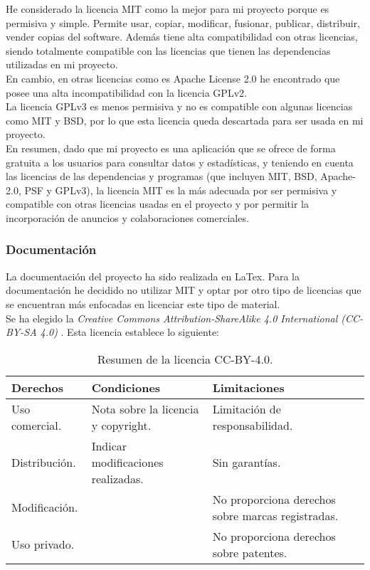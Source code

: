 He considerado la licencia MIT como la mejor para mi proyecto porque es permisiva y simple. Permite usar, copiar, modificar, fusionar, publicar, distribuir, vender copias del software. Además tiene alta compatibilidad con otras licencias, siendo totalmente compatible con las licencias que tienen las dependencias utilizadas en mi proyecto. \\
En cambio, en otras licencias como es Apache License 2.0 he encontrado que posee una alta incompatibilidad con la licencia GPLv2. \\
La licencia GPLv3 es menos permisiva y no es compatible con algunas licencias como MIT y BSD, por lo que esta licencia queda descartada para ser usada en mi proyecto. \\

En resumen, dado que mi proyecto es una aplicación que se ofrece de forma gratuita a los usuarios para consultar datos y estadísticas, y teniendo en cuenta las licencias de las dependencias y programas (que incluyen MIT, BSD, Apache-2.0, PSF y GPLv3), la licencia MIT es la más adecuada por ser permisiva y compatible con otras licencias usadas en el proyecto y por permitir la incorporación de anuncios y colaboraciones comerciales.

\subsubsection{Documentación}
La documentación del proyecto ha sido realizada en LaTex. Para la documentación he decidido no utilizar MIT y optar por otro tipo de licencias que se encuentran más enfocadas en licenciar este tipo de material. \\
Se ha elegido la \textit{Creative Commons Attribution-ShareAlike 4.0 International (CC-BY-SA 4.0)} \cite{CC:latex}. Esta licencia establece lo siguiente: \\
\raggedbottom 
\begin{table}[H] %
\centering
\begin{tabular}{>{\raggedright}m{4cm} >{\raggedright}m{4cm} >{\raggedright\arraybackslash}m{4cm}}
\toprule
\textbf{Derechos} & \textbf{Condiciones} & \textbf{Limitaciones} \\
\midrule
Uso comercial. & Nota sobre la licencia y copyright. & Limitación de responsabilidad. \\
Distribución. & Indicar modificaciones realizadas. & Sin garantías. \\
Modificación. & & No proporciona derechos sobre marcas registradas. \\
Uso privado. & & No proporciona derechos sobre patentes. \\
\bottomrule
\end{tabular}
\caption{Resumen de la licencia CC-BY-4.0.}
\label{table:ccby40}
\end{table}

